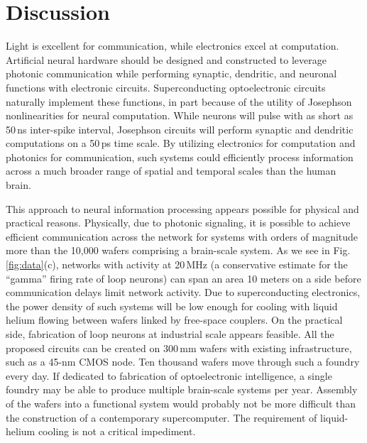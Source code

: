 \documentclass[twocolumn]{article}
\begin{document}
\section{\label{sec:discussion}Discussion}
Light is excellent for communication, while electronics excel at computation. Artificial neural hardware should be designed and constructed to leverage photonic communication while performing synaptic, dendritic, and neuronal functions with electronic circuits. Superconducting optoelectronic circuits naturally implement these functions, in part because of the utility of Josephson nonlinearities for neural computation. While neurons will pulse with as short as 50\,ns inter-spike interval, Josephson circuits will perform synaptic and dendritic computations on a 50\,ps time scale. By utilizing electronics for computation and photonics for communication, such systems could efficiently process information across a much broader range of spatial and temporal scales than the human brain. 

This approach to neural information processing appears possible for physical and practical reasons. Physically, due to photonic signaling, it is possible to achieve efficient communication across the network for systems with orders of magnitude more than the 10,000 wafers comprising a brain-scale system. As we see in Fig.\,\ref{fig:data}(c), networks with activity at 20\,MHz (a conservative estimate for the ``gamma'' firing rate of loop neurons) can span an area 10 meters on a side before communication delays limit network activity. Due to superconducting electronics, the power density of such systems will be low enough for cooling with liquid helium flowing between wafers linked by free-space couplers. On the practical side, fabrication of loop neurons at industrial scale appears feasible. All the proposed circuits can be created on 300\,mm wafers with existing infrastructure, such as a 45-nm CMOS node. Ten thousand wafers move through such a foundry every day. If dedicated to fabrication of optoelectronic intelligence, a single foundry may be able to produce multiple brain-scale systems per year. Assembly of the wafers into a functional system would probably not be more difficult than the construction of a contemporary supercomputer. The requirement of liquid-helium cooling is not a critical impediment.
\end{document}
